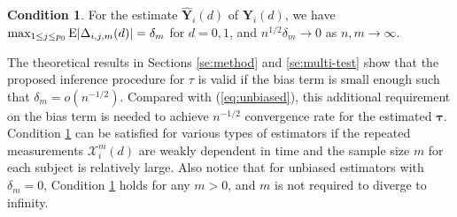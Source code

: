\documentclass[12pt]{article}
\def\T{{ \mathrm{\scriptscriptstyle T} }}
\theoremstyle{definition}
\newtheorem{as}{Condition}
\newcommand{\E}{\rm E}
\newcommand{\V}{\rm Var}
\newcommand{\bT}{{\mathbf T}}
\newcommand{\bW}{{\mathbf W}}
\newcommand{\bY}{{\mathbf Y}}
\newcommand{\bDelta}{\boldsymbol{\Delta}}
\newcommand{\btau}{\boldsymbol{\tau}}
\begin{document}
\begin{as}
For the estimate $\hat{\bY}_{i}(d)$ of $\bY_{i}(d)$, we have  
$\max_{1\leq j \leq p_0} {\E}|\Delta_{i, j, m}(d)| = \delta_m$
for $d = 0, 1$, 
and $n^{1/2} \delta_m \to 0$ as $n, m \to \infty$.
\label{as:est}\end{as}


The theoretical results in Sections \ref{se:method} and \ref{se:multi-test} show that the proposed inference procedure for $\tau$ is valid if the bias term is small enough such that $\delta_m = o(n^{-1/2})$. Compared with (\ref{eq:unbiased}), this additional requirement on the bias term is needed to achieve $n^{-1/2}$ convergence rate for the estimated $\btau$. 
Condition \ref{as:est} can be satisfied for various types of estimators if the repeated measurements $\mathcal{X}_i^m(d)$ are weakly dependent in time and the sample size $m$ for each subject is relatively large.
Also notice that for unbiased estimators with $\delta_m = 0$, Condition \ref{as:est} holds for any $m > 0$, and 
$m$ is not required to diverge to infinity.
\end{document}
